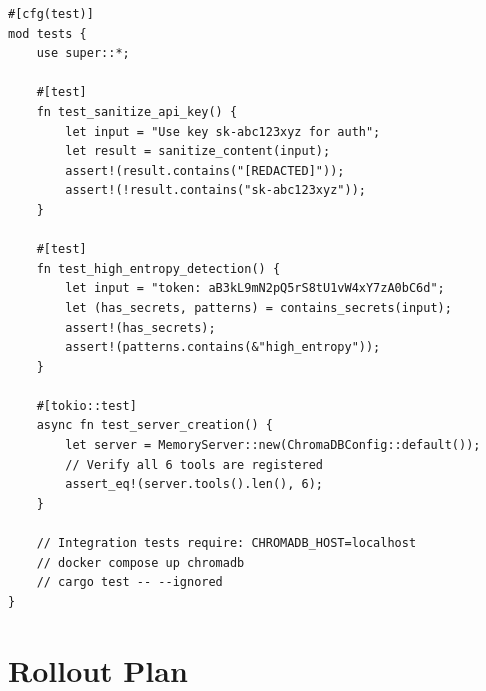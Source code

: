 \documentclass[11pt,letterpaper]{article}
\begin{document}
\begin{lstlisting}[caption={Rust unit tests for sanitization and server}]
#[cfg(test)]
mod tests {
    use super::*;

    #[test]
    fn test_sanitize_api_key() {
        let input = "Use key sk-abc123xyz for auth";
        let result = sanitize_content(input);
        assert!(result.contains("[REDACTED]"));
        assert!(!result.contains("sk-abc123xyz"));
    }

    #[test]
    fn test_high_entropy_detection() {
        let input = "token: aB3kL9mN2pQ5rS8tU1vW4xY7zA0bC6d";
        let (has_secrets, patterns) = contains_secrets(input);
        assert!(has_secrets);
        assert!(patterns.contains(&"high_entropy"));
    }

    #[tokio::test]
    async fn test_server_creation() {
        let server = MemoryServer::new(ChromaDBConfig::default());
        // Verify all 6 tools are registered
        assert_eq!(server.tools().len(), 6);
    }

    // Integration tests require: CHROMADB_HOST=localhost
    // docker compose up chromadb
    // cargo test -- --ignored
}
\end{lstlisting}

\section{Rollout Plan}

\begin{center}
\end{center}
\end{document}
